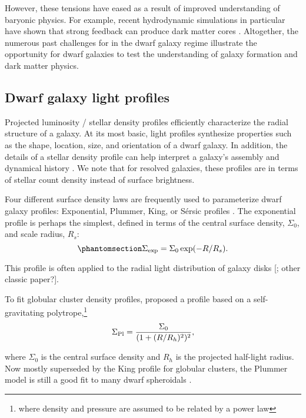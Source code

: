 However, these tensions have eased as a result of improved understanding
of baryonic physics. For example, recent hydrodynamic simulations in
particular have shown that strong feedback can produce dark matter cores
\citetext{\citealp[e.g.,][\citet{tollet+2016}]{navarro+eke+frenk1996}; \citealp{fitts+2017}; \citealp{benitez-llambay+2019}; \citealp{orkney+2021}}.
Altogether, the numerous past challenges for \LCDM in the dwarf galaxy
regime illustrate the opportunity for dwarf galaxies to test the
understanding of galaxy formation and dark matter physics.

\subsection{Dwarf galaxy light profiles}\label{sec:exponential_profiles}

Projected luminosity / stellar density profiles efficiently characterize
the radial structure of a galaxy. At its most basic, light profiles
synthesize properties such as the shape, location, size, and orientation
of a dwarf galaxy. In addition, the details of a stellar density profile
can help interpret a galaxy's assembly and dynamical history
\citep[e.g.,][, \citet{lee+2018}, \citet{querci+2025}]{penarrubia+2009}.
We note that for resolved galaxies, these profiles are in terms of
stellar count density instead of surface brightness.

Four different surface density laws are frequently used to parameterize
dwarf galaxy profiles: Exponential, Plummer, King, or Sérsic profiles
\citep[e.g.,][]{munoz+2018}. The exponential profile is perhaps the
simplest, defined in terms of the central surface density, \(\Sigma_0\),
and scale radius, \(R_s\):
\begin{equation}\protect\phantomsection\label{eq:exponential_law}{
\Sigma_{\rm exp} = \Sigma_0\exp(-R / R_s).
}\end{equation}

This profile is often applied to the radial light distribution of galaxy
disks {[}\citet{freeman1970}; other classic paper?{]}.

To fit globular cluster density profiles, \citet{plummer1911} proposed a
profile based on a self-gravitating polytrope,\footnote{where density
  and pressure are assumed to be related by a power law}
\begin{equation}{
\Sigma_{\rm Pl} = \frac{\Sigma_0}{(1 + (R/R_h)^2)^2},
}\end{equation}

where \(\Sigma_0\) is the central surface density and \(R_h\) is the
projected half-light radius. Now mostly superseded by the King profile
for globular clusters, the Plummer model is still a good fit to many
dwarf spheroidals \citep[e.g.,][]{moskowitz+walker2020}.


